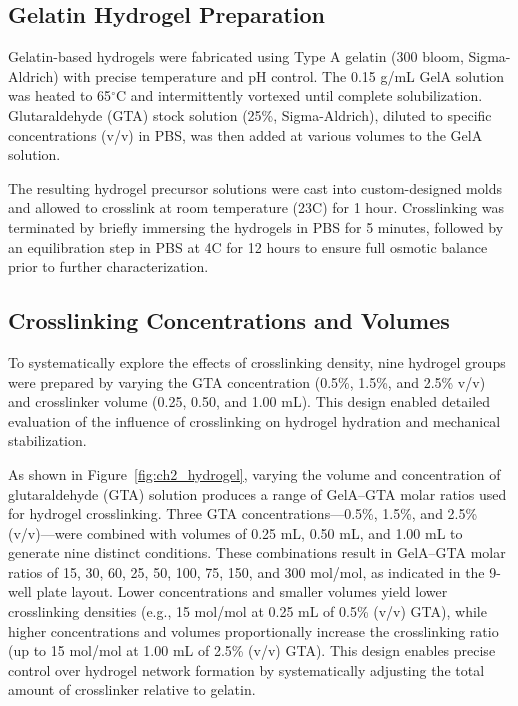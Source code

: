 \subsection{Gelatin Hydrogel Preparation}

Gelatin-based hydrogels were fabricated using Type A gelatin (300 bloom, Sigma-Aldrich) with precise temperature and pH control. The 0.15 g/mL GelA solution was heated to 65$^\circ$C and intermittently vortexed until complete solubilization. Glutaraldehyde (GTA) stock solution (25\%, Sigma-Aldrich), diluted to specific concentrations (v/v) in PBS, was then added at various volumes to the GelA solution.

The resulting hydrogel precursor solutions were cast into custom-designed molds and allowed to crosslink at room temperature (23\textdegree C) for 1 hour. Crosslinking was terminated by briefly immersing the hydrogels in PBS for 5 minutes, followed by an equilibration step in PBS at 4\textdegree C for 12 hours to ensure full osmotic balance prior to further characterization.

\newpage
\subsection{Crosslinking Concentrations and Volumes}

To systematically explore the effects of crosslinking density, nine hydrogel groups were prepared by varying the GTA concentration (0.5\%, 1.5\%, and 2.5\% v/v) and crosslinker volume (0.25, 0.50, and 1.00 mL). This design enabled detailed evaluation of the influence of crosslinking on hydrogel hydration and mechanical stabilization.

As shown in Figure~\ref{fig:ch2_hydrogel}, varying the volume and concentration of glutaraldehyde (GTA) solution produces a range of GelA--GTA molar ratios used for hydrogel crosslinking. Three GTA concentrations—0.5\%, 1.5\%, and 2.5\% (v/v)—were combined with volumes of 0.25 mL, 0.50 mL, and 1.00 mL to generate nine distinct conditions. These combinations result in GelA--GTA molar ratios of 15, 30, 60, 25, 50, 100, 75, 150, and 300 mol/mol, as indicated in the 9-well plate layout. Lower concentrations and smaller volumes yield lower crosslinking densities (e.g., 15 mol/mol at 0.25 mL of 0.5\% (v/v) GTA), while higher concentrations and volumes proportionally increase the crosslinking ratio (up to 15 mol/mol at 1.00 mL of 2.5\% (v/v) GTA). This design enables precise control over hydrogel network formation by systematically adjusting the total amount of crosslinker relative to gelatin.


